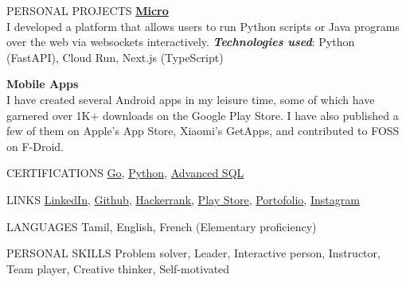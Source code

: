 \documentclass{template}
\begin{document}
\begin{rSection}{PERSONAL PROJECTS}
\textbf{\href{https://runmicro.princeappstrudio.in}{Micro}} \\
I developed a platform that allows users to run Python scripts or Java programs over the web via websockets interactively.
\textbf{\textit{Technologies used}}: Python (FastAPI), Cloud Run, Next.js (TypeScript)

\textbf{Mobile Apps} \\
I have created several Android apps in my leisure time, some of which have garnered over 1K+ downloads on the Google Play Store. I have also published a few of them on Apple's App Store, Xiaomi's GetApps, and contributed to FOSS on F-Droid.
\end{rSection}

\begin{rSection}{CERTIFICATIONS}
\href{https://www.hackerrank.com/certificates/7a93b8463217}{Go},
\href{https://www.hackerrank.com/certificates/1ba30bc9d411}{Python},
\href{https://www.hackerrank.com/certificates/271a02a6623d}{Advanced SQL}
\end{rSection}

\begin{rSection}{LINKS}
\href{https://www.linkedin.com/in/sanjivy-kumaravel-1bb99a173}{LinkedIn},
\href{https://github.com/princesanjivy}{Github},
\href{https://www.hackerrank.com/profile/sanjivy_android}{Hackerrank},
\href{https://play.google.com/store/apps/dev?id=6439925551269057866}{Play Store},
\href{https://princesanjivy-portfolio.web.app/}{Portofolio},
\href{https://www.instagram.com/princesanjivy}{Instagram}
\end{rSection}

\begin{rSection}{LANGUAGES}
Tamil, English, French (Elementary proficiency)
\end{rSection}

\begin{rSection}{PERSONAL SKILLS}
Problem solver, Leader, Interactive person, Instructor, Team player, Creative thinker, Self-motivated
\end{rSection}
\end{document}
